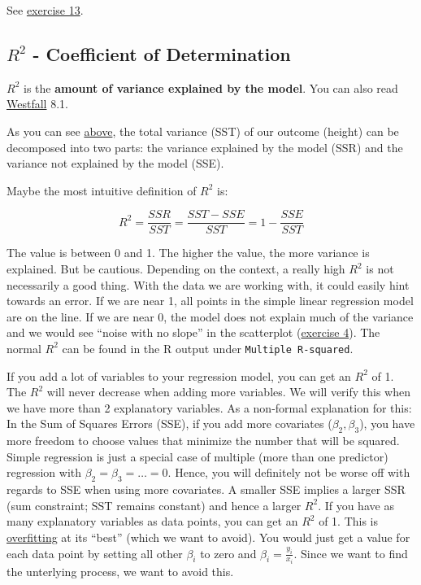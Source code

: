 \documentclass[
]{book}
\begin{document}
See \hyperref[exercise13_simpl_lin_reg]{exercise 13}.

\subsection{\texorpdfstring{\(R^2\) - Coefficient of Determination}{R\^{}2 - Coefficient of Determination}}\label{r2---coefficient-of-determination}

\href{https://en.wikipedia.org/wiki/Coefficient_of_determination}{\(R^2\)}
is the \textbf{amount of variance explained by the model}.
You can also read \href{https://www.routledge.com/Understanding-Regression-Analysis-A-Conditional-Distribution-Approach/Westfall-Arias/p/book/9780367493516?srsltid=AfmBOore3O_Ciecl0TTkr9AjPIY1d6OmbQa7o7IAdKpTSkD8s9HkwzD4}{Westfall} 8.1.

As you can see
\hyperref[analysis_of_variance]{above}, the total variance (SST) of our outcome (height)
can be decomposed into two parts: the variance explained by the model (SSR)
and the variance not explained by the model (SSE).

Maybe the most intuitive definition of \(R^2\) is:

\[ R^2 = \frac{SSR}{SST} = \frac{SST - SSE}{SST} = 1 - \frac{SSE}{SST}\]

The value is between 0 and 1. The higher the value, the more variance is explained.
But be cautious. Depending on the context, a really high \(R^2\) is not
necessarily a good thing. With the data we are working with,
it could easily hint towards an error. If we are near 1,
all points in the simple linear regression model are on the line.
If we are near 0, the model does not explain much of the variance
and we would see ``noise with no slope'' in the scatterplot (\hyperref[exercise4_simpl_lin_reg]{exercise 4}).
The normal \(R^2\) can be found in the R output under \texttt{Multiple\ R-squared}.

If you add a lot of variables to your regression model, you can get an
\(R^2\) of 1. The \(R^2\) will never decrease when adding more variables.
We will verify this when we have more than 2 explanatory variables.
As a non-formal explanation for this: In the Sum of Squares Errors (SSE),
if you add more covariates (\(\beta_2, \beta_3\)), you have more freedom
to choose values that minimize the number that will be squared. Simple regression
is just a special case of multiple (more than one predictor) regression with \(\beta_2=\beta_3=\dots=0\).
Hence, you will definitely not be worse off with regards to SSE when using more covariates.
A smaller SSE implies a larger SSR (sum constraint; SST remains constant) and hence a larger \(R^2\).
If you have as many explanatory variables as data points, you can get an \(R^2\) of 1. This is
\href{https://en.wikipedia.org/wiki/Overfitting}{overfitting} at its ``best'' (which we want to avoid).
You would just get a value for each data point by setting all other \(\beta_i\) to zero and
\(\beta_i = \frac{y_i}{x_i}\).
Since we want to find the unterlying process, we want to avoid this.
\end{document}
